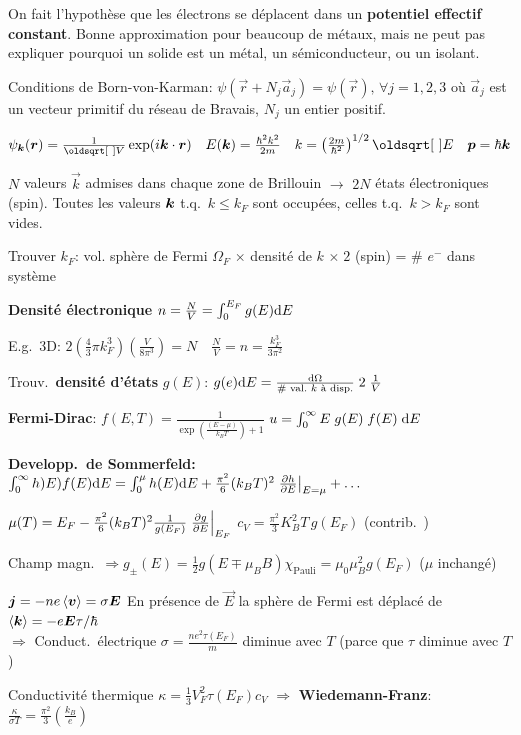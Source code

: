 On fait l’hypothèse que les électrons se déplacent dans un \textbf{potentiel eﬀectif constant}. Bonne approximation pour beaucoup de métaux, mais ne peut pas expliquer pourquoi un solide est un métal, un sémiconducteur, ou un isolant.
\begin{squishlist}
    \item Conditions de Born-von-Karman: $\psi(\vec{r} + N_j \vec{a}_j) = \psi(\vec{r}), \, \forall j=1,2,3$ où $\vec{a}_j$ est un vecteur primitif du réseau de Bravais, $N_j$ un entier positif.
    \item $\psi_{\vk}(\vr) = \frac{1}{\sqrt{V}}\exp(i \vk \cdot \vr) \quad E(\vk) = \frac{\hbar^2 k^2}{2m} \quad k = \left(\frac{2m}{\hbar^2}\right)^{1/2} \sqrt{E} \quad \vec{p}=\hbar \vec{k}$
    \item $N$ valeurs $\vec{k}$ admises dans chaque zone de Brillouin $\rightarrow$ $2N$ états électroniques (spin). Toutes les valeurs $\vk$ t.q.\ $k\leq k_F$ sont occupées, celles t.q.\ $k > k_F$ sont vides.
    \item Trouver $k_F$: vol. sphère de Fermi $\Omega_F$ $\times$ densité de $k$ $\times \; 2$ (spin) = \# $e^-$ dans système 
    \item \textbf{Densité électronique} $n = \frac{N}{V} = \int_0^{E_F} g(E) \ud E$
    \item E.g.\ 3D: $2 \left( \frac{4}{3}\pi k^3_F\right) \left( \frac{V}{8\pi^3}\right) = N \quad \frac{N}{V} = n = \frac{k_F^3}{3\pi^2}$

    \item Trouv.\ \textbf{densité d'états} $g(E)$: $g(e) \ud E = \frac{\ud \Omega}{\text{\# val.\ $k$ à disp.}} \; 2 \; \frac{1}{V}$ 
    \item \textbf{Fermi-Dirac}: $f(E,T) = \frac{1}{\exp\left(\frac{(E- \mu)}{k_B T}\right) + 1}$ \squishsep $u = \int_{0}^{\infty}E \; g(E)\; f(E) \; \ud E$
    \item \textbf{Developp.\ de Sommerfeld:} $\int_{0}^{\infty}h)E) f(E) \ud E = \int_{0}^{\mu} h(E) \ud E + \frac{\pi^2}{6}(k_BT)^2 \left.\D{E}{h}\right|_{E=\mu} + \ldots$
    \item $\mu(T) = E_F - \frac{\pi^2}{6}(k_B T)^2 \frac{1}{g(E_F)} \left.\D{E}{g}\right|_{E_F}$ \squishsep $c_V = \frac{\pi^2}{3}K_B^2 T \, g(E_F) $ (contrib.\ \elec)
    \item Champ magn.\ $\Rightarrow g_{\pm}(E) = \frac{1}{2}g(E\mp \mu_B B)$\quad $\chi_{\text{Pauli}} = \mu_0 \mu_B^2 g(E_F)$ ($\mu$ inchangé)
    \item $\vec{j} = -ne \braket{\vec{v}} = \sigma \vec{E}$ \quad En présence de $\vec{E}$ la sphère de Fermi est déplacé de $\braket{\vk}=-e\vec{E}\tau / \hbar$ \\
    $\Longrightarrow$ Conduct.\ électrique $\sigma = \frac{n e^2 \tau(E_F)}{m}$ diminue avec $T$ (parce que $\tau$ diminue avec $T$)
    \item Conductivité thermique $\kappa = \frac{1}{3}V_F^2 \tau(E_F) c_V$ $\Rightarrow$ \textbf{Wiedemann-Franz}: $\frac{\kappa}{\sigma T} = \frac{\pi^2}{3}\left(\frac{k_B}{e}\right)$
\end{squishlist}


